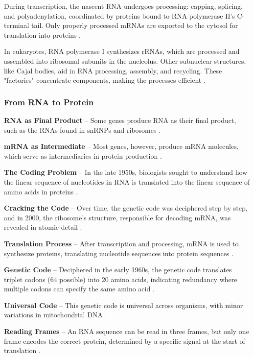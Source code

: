 During transcription, the nascent RNA undergoes processing: capping, splicing, and polyadenylation, coordinated by proteins bound to RNA polymerase II’s C-terminal tail. Only properly processed mRNAs are exported to the cytosol for translation into proteins \cite*{L1-Chapter6}.

In eukaryotes, RNA polymerase I synthesizes rRNAs, which are processed and assembled into ribosomal subunits in the nucleolus. Other subnuclear structures, like Cajal bodies, aid in RNA processing, assembly, and recycling. These "factories" concentrate components, making the processes efficient \cite*{L1-Chapter6}.

\subsubsection{From RNA to Protein}
\textbf{RNA as Final Product} – Some genes produce RNA as their final product, such as the RNAs found in snRNPs and ribosomes \cite*{L1-Chapter6}.

\textbf{mRNA as Intermediate} – Most genes, however, produce mRNA molecules, which serve as intermediaries in protein production \cite*{L1-Chapter6}.

\textbf{The Coding Problem} – In the late 1950s, biologists sought to understand how the linear sequence of nucleotides in RNA is translated into the linear sequence of amino acids in proteins \cite*{L1-Chapter6}.

\textbf{Cracking the Code} – Over time, the genetic code was deciphered step by step, and in 2000, the ribosome’s structure, responsible for decoding mRNA, was revealed in atomic detail \cite*{L1-Chapter6}.

\textbf{Translation Process} – After transcription and processing, mRNA is used to synthesize proteins, translating nucleotide sequences into protein sequences \cite*{L1-Chapter6}.

\textbf{Genetic Code} – Deciphered in the early 1960s, the genetic code translates triplet codons (64 possible) into 20 amino acids, indicating redundancy where multiple codons can specify the same amino acid \cite*{L1-Chapter6}.

\textbf{Universal Code} – This genetic code is universal across organisms, with minor variations in mitochondrial DNA \cite*{L1-Chapter6}.

\textbf{Reading Frames} – An RNA sequence can be read in three frames, but only one frame encodes the correct protein, determined by a specific signal at the start of translation \cite*{L1-Chapter6}.

